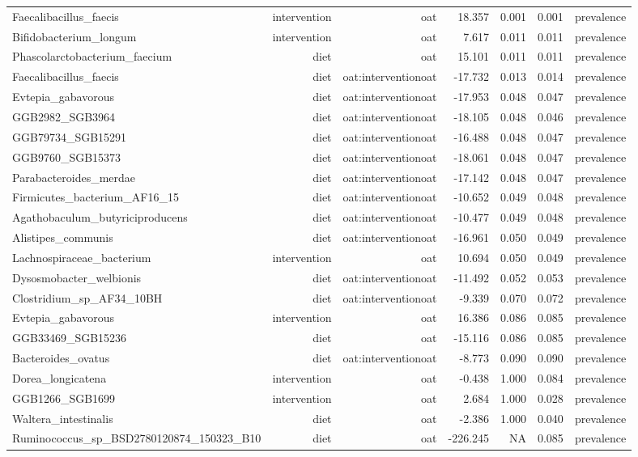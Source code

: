 \documentclass[
]{article}
\begin{document}
\begin{longtable}[t]{lrrrrrr}
Faecalibacillus\_faecis & intervention & oat & 18.357 & 0.001 & 0.001 & prevalence\\
\addlinespace
Bifidobacterium\_longum & intervention & oat & 7.617 & 0.011 & 0.011 & prevalence\\
Phascolarctobacterium\_faecium & diet & oat & 15.101 & 0.011 & 0.011 & prevalence\\
Faecalibacillus\_faecis & diet & oat:interventionoat & -17.732 & 0.013 & 0.014 & prevalence\\
Evtepia\_gabavorous & diet & oat:interventionoat & -17.953 & 0.048 & 0.047 & prevalence\\
GGB2982\_SGB3964 & diet & oat:interventionoat & -18.105 & 0.048 & 0.046 & prevalence\\
\addlinespace
GGB79734\_SGB15291 & diet & oat:interventionoat & -16.488 & 0.048 & 0.047 & prevalence\\
GGB9760\_SGB15373 & diet & oat:interventionoat & -18.061 & 0.048 & 0.047 & prevalence\\
Parabacteroides\_merdae & diet & oat:interventionoat & -17.142 & 0.048 & 0.047 & prevalence\\
Firmicutes\_bacterium\_AF16\_15 & diet & oat:interventionoat & -10.652 & 0.049 & 0.048 & prevalence\\
Agathobaculum\_butyriciproducens & diet & oat:interventionoat & -10.477 & 0.049 & 0.048 & prevalence\\
\addlinespace
Alistipes\_communis & diet & oat:interventionoat & -16.961 & 0.050 & 0.049 & prevalence\\
Lachnospiraceae\_bacterium & intervention & oat & 10.694 & 0.050 & 0.049 & prevalence\\
Dysosmobacter\_welbionis & diet & oat:interventionoat & -11.492 & 0.052 & 0.053 & prevalence\\
Clostridium\_sp\_AF34\_10BH & diet & oat:interventionoat & -9.339 & 0.070 & 0.072 & prevalence\\
Evtepia\_gabavorous & intervention & oat & 16.386 & 0.086 & 0.085 & prevalence\\
\addlinespace
GGB33469\_SGB15236 & diet & oat & -15.116 & 0.086 & 0.085 & prevalence\\
Bacteroides\_ovatus & diet & oat:interventionoat & -8.773 & 0.090 & 0.090 & prevalence\\
Dorea\_longicatena & intervention & oat & -0.438 & 1.000 & 0.084 & prevalence\\
GGB1266\_SGB1699 & intervention & oat & 2.684 & 1.000 & 0.028 & prevalence\\
Waltera\_intestinalis & diet & oat & -2.386 & 1.000 & 0.040 & prevalence\\
\addlinespace
Ruminococcus\_sp\_BSD2780120874\_150323\_B10 & diet & oat & -226.245 & NA & 0.085 & prevalence\\*
\end{longtable}
\end{document}
